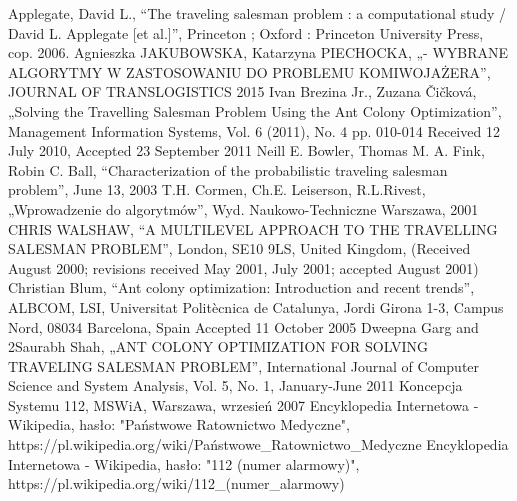 \documentclass[12pt]{article} %
\begin{document}
\begin{thebibliography}{99}
Applegate, David L., “The traveling salesman problem : a computational study / David L. Applegate [et al.]”, Princeton ; Oxford : Princeton University Press, cop. 2006.
Agnieszka JAKUBOWSKA, Katarzyna PIECHOCKA, „- WYBRANE ALGORYTMY W ZASTOSOWANIU DO PROBLEMU KOMIWOJAŻERA”, JOURNAL OF TRANSLOGISTICS 2015
Ivan Brezina Jr., Zuzana Čičková, „Solving the Travelling Salesman Problem Using the Ant Colony Optimization”, Management Information Systems, Vol. 6 (2011), No. 4 pp. 010-014 Received 12 July 2010, Accepted 23 September 2011
Neill E. Bowler, Thomas M. A. Fink, Robin C. Ball, “Characterization of the probabilistic traveling salesman problem”, June 13, 2003
T.H. Cormen, Ch.E. Leiserson, R.L.Rivest, „Wprowadzenie do algorytmów”, Wyd. Naukowo-Techniczne Warszawa, 2001
CHRIS WALSHAW, “A MULTILEVEL APPROACH TO THE TRAVELLING SALESMAN PROBLEM”, London, SE10 9LS, United Kingdom, (Received August 2000; revisions received May 2001, July 2001; accepted August 2001)
Christian Blum, “Ant colony optimization: Introduction and recent trends”, ALBCOM, LSI, Universitat Politècnica de Catalunya, Jordi Girona 1-3, Campus Nord, 08034 Barcelona, Spain Accepted 11 October 2005
Dweepna Garg and 2Saurabh Shah, „ANT COLONY OPTIMIZATION FOR SOLVING TRAVELING SALESMAN PROBLEM”, International Journal of Computer Science and System Analysis, Vol. 5, No. 1, January-June 2011
Koncepcja Systemu 112, MSWiA, Warszawa, wrzesień 2007
Encyklopedia Internetowa - Wikipedia, hasło: "Państwowe Ratownictwo Medyczne",
https://pl.wikipedia.org/wiki/Państwowe\_Ratownictwo\_Medyczne
Encyklopedia Internetowa - Wikipedia, hasło: "112 (numer alarmowy)",
https://pl.wikipedia.org/wiki/112\_(numer\_alarmowy)




\end{thebibliography}

\end{document}
